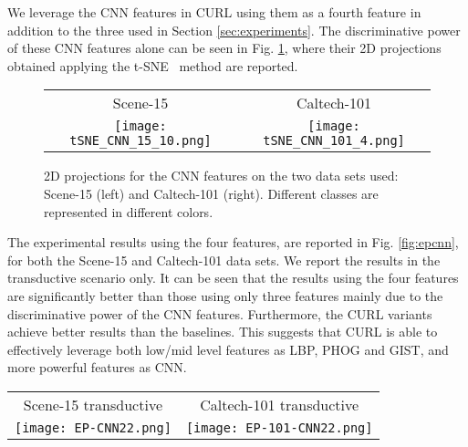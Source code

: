 \documentclass[journal,11pt]{IEEEtran}
\begin{document}
We leverage the CNN features in CURL using them as a fourth feature in addition to the three used in Section \ref{sec:experiments}. The discriminative power of these CNN features alone can be seen in Fig. \ref{fig:tsneCNN}, where their 2D projections obtained applying the t-SNE~\cite{van2008visualizing} method are reported.

\begin{figure}[tbp]%
\centering
\begin{tabular}{cc}
\footnotesize{Scene-15} & \footnotesize{Caltech-101}\\
\texttt{[image: tSNE\_CNN\_15\_10.png]} &
\texttt{[image: tSNE\_CNN\_101\_4.png]} \\
\end{tabular}
\caption{2D projections for the CNN features on the two data sets used: Scene-15 (left) and Caltech-101 (right). Different classes are represented in different colors.}%
\label{fig:tsneCNN}%
\end{figure}

The experimental results using the four features, are reported in Fig. \ref{fig:epcnn}, for both the Scene-15 and Caltech-101 data sets. We report the results in the transductive scenario only. It can be seen that the results using the four features are significantly better than those using only three features mainly due to the discriminative power of the CNN features. Furthermore, the CURL variants achieve better results than the baselines. This suggests that CURL is able to effectively leverage both low/mid level features as LBP, PHOG and GIST, and  more powerful features as CNN.

\begin{figure*}[ht]%
\centering
\begin{tabular}{cc}
\footnotesize{Scene-15 transductive} & \footnotesize{Caltech-101 transductive}\\
\texttt{[image: EP-CNN22.png]} &
\texttt{[image: EP-101-CNN22.png]} \\
\end{tabular}
\caption{Mean Average Precision (MAP) varying the number of labeled images per class, obtained on the Scene-15 data set (left), and on the Caltech-101
data set (right). Results are obtained using GIST, PHOG, LBP and CNN features.}
\label{fig:epcnn}
\end{figure*}
\end{document}
